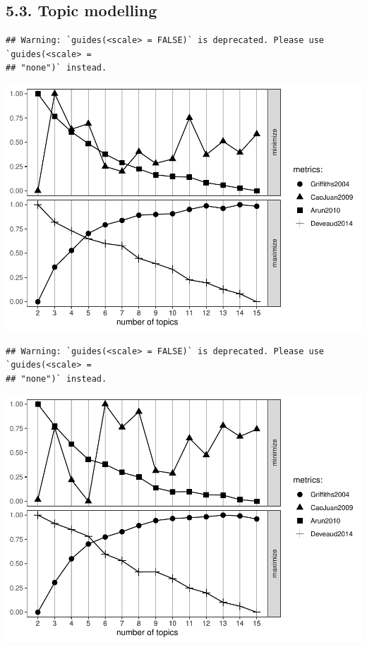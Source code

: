 \documentclass[]{elsarticle} %
\begin{document}
\hypertarget{topic-modelling-1}{%
\subsection{5.3. Topic modelling}\label{topic-modelling-1}}

\begin{verbatim}
## Warning: `guides(<scale> = FALSE)` is deprecated. Please use `guides(<scale> =
## "none")` instead.
\end{verbatim}

\includegraphics{AST-Framing-Ontario_files/figure-latex/evaluate-lda-1.pdf}

\begin{verbatim}
## Warning: `guides(<scale> = FALSE)` is deprecated. Please use `guides(<scale> =
## "none")` instead.
\end{verbatim}

\includegraphics{AST-Framing-Ontario_files/figure-latex/evaluate-lda-2.pdf}
\end{document}
